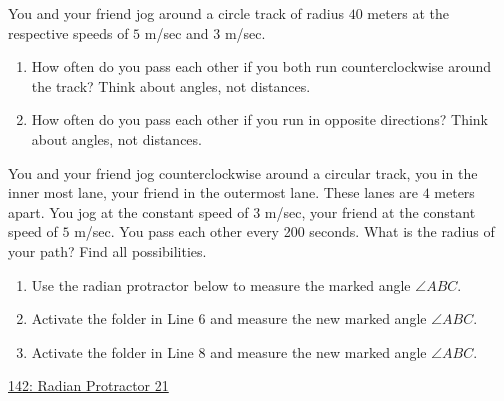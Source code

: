 \documentclass{ximera}
\begin{document}
\begin{question}  \label{QPdfdft4tt4yg}
You and your friend jog around a circle track of radius $40$ meters at the respective speeds of $5$ m/sec and $3$ m/sec.

\begin{enumerate}

\item How often do you pass each other if you both run counterclockwise around the track? Think about angles, not distances.

\item How often do you pass each other if you run in opposite directions? Think about angles, not distances.


\end{enumerate}
\end{question}

\begin{question} \label{QOIDftrerggedsf3}
You and your friend jog counterclockwise around a circular track, you in the inner most lane, your friend in the outermost lane. These lanes are $4$ meters apart. You jog at the constant speed of $3$ m/sec, your friend at the constant speed of $5$ m/sec.
You pass each other every 200 seconds. What is the radius of your path? Find all possibilities.

\end{question}





\begin{question} \label{Q5fggtg4t4tggt4}
\begin{enumerate}
\item Use the radian protractor below to measure the marked angle $\angle ABC$.

\item Activate the folder in Line 6 and measure the new marked angle $\angle ABC$.

\item Activate the folder in Line 8 and measure the new marked angle $\angle ABC$.

\end{enumerate}

\begin{onlineOnly}
    \begin{center}
\end{center}
\end{onlineOnly}



\href{https://www.desmos.com/calculator/dqedbpsohm}{142: Radian Protractor 21}
\end{question}
\end{document}
